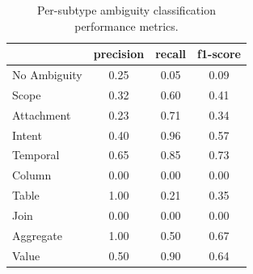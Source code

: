 \begin{table}[htbp]
  \centering
  \begin{tabular}{l c c c}
    & precision & recall & f1-score \\
    \midrule
    No Ambiguity   & 0.25 & 0.05 & 0.09 \\
    Scope          & 0.32 & 0.60 & 0.41 \\
    Attachment     & 0.23 & 0.71 & 0.34 \\
    Intent         & 0.40 & 0.96 & 0.57 \\
    Temporal       & 0.65 & 0.85 & 0.73 \\
    Column         & 0.00 & 0.00 & 0.00 \\
    Table          & 1.00 & 0.21 & 0.35 \\
    Join           & 0.00 & 0.00 & 0.00 \\
    Aggregate      & 1.00 & 0.50 & 0.67 \\
    Value          & 0.50 & 0.90 & 0.64 \\
  \end{tabular}
  \caption{Per-subtype ambiguity classification performance metrics.}
  \label{tab:subtype_metrics}
\end{table}